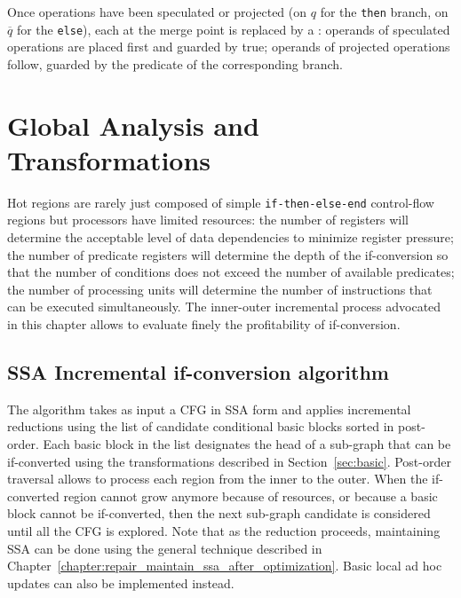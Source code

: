 Once operations have been speculated or projected (on $q$ for the \texttt{then} branch, on $\overline{q}$ for the \texttt{else}), each \phifuns at the merge point is replaced by a \psifun: 
operands of speculated operations are placed first and guarded by true; 
operands of projected operations follow, guarded by the predicate of the corresponding branch.

\section{Global Analysis and Transformations}
\label{sec:if_conversion:hyperblock}
Hot regions are rarely just composed of simple \texttt{if-then-else-end} control-flow regions but processors have limited resources: 
the number of registers will determine the acceptable level of data dependencies to minimize register pressure; 
the number of predicate registers will determine the depth of the if-conversion so that the number of conditions does not exceed the number of available predicates; 
the number of processing units will determine the number of instructions that can be executed simultaneously. 
The inner-outer incremental process advocated in this chapter allows to evaluate finely the profitability of if-conversion.

\subsection{SSA Incremental if-conversion algorithm}


The algorithm takes as input a CFG in SSA form and applies incremental reductions using the list of candidate conditional basic blocks sorted in post-order. 
Each basic block in the list designates the head of a sub-graph that can be if-converted using the transformations described in Section~\ref{sec:basic}. 
Post-order traversal allows to process each region from the inner to the outer. 
When the if-converted region cannot grow anymore because of resources, or because a basic block cannot be if-converted, then the next sub-graph candidate is considered until all the CFG is explored.
%
%
Note that as the reduction proceeds, maintaining SSA can be done using the general technique described in Chapter~\ref{chapter:repair_maintain_ssa_after_optimization}. 
Basic local ad hoc updates can also be implemented instead.

